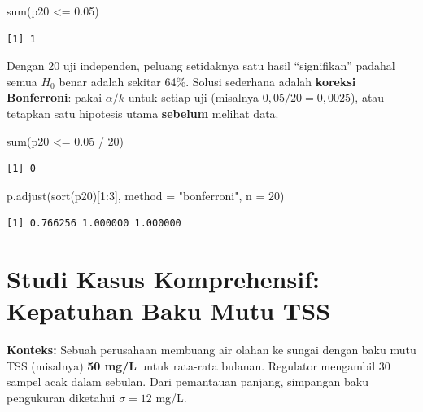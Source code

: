 \documentclass[
  indonesian,
  letterpaper,
]{book}
\newenvironment{Shaded}{\begin{snugshade}}{\end{snugshade}}
\newcommand{\AttributeTok}[1]{\textcolor[rgb]{0.40,0.45,0.13}{#1}}
\newcommand{\DecValTok}[1]{\textcolor[rgb]{0.68,0.00,0.00}{#1}}
\newcommand{\FloatTok}[1]{\textcolor[rgb]{0.68,0.00,0.00}{#1}}
\newcommand{\FunctionTok}[1]{\textcolor[rgb]{0.28,0.35,0.67}{#1}}
\newcommand{\NormalTok}[1]{\textcolor[rgb]{0.00,0.23,0.31}{#1}}
\newcommand{\SpecialCharTok}[1]{\textcolor[rgb]{0.37,0.37,0.37}{#1}}
\newcommand{\StringTok}[1]{\textcolor[rgb]{0.13,0.47,0.30}{#1}}
\begin{document}
\begin{Shaded}
\begin{Highlighting}[]
\FunctionTok{sum}\NormalTok{(p20 }\SpecialCharTok{\textless{}=} \FloatTok{0.05}\NormalTok{)}
\end{Highlighting}
\end{Shaded}

\begin{verbatim}
[1] 1
\end{verbatim}

Dengan 20 uji independen, peluang setidaknya satu hasil ``signifikan''
padahal semua \(H_0\) benar adalah sekitar 64\%. Solusi sederhana adalah
\textbf{koreksi Bonferroni}: pakai \(\alpha/k\) untuk setiap uji
(misalnya \(0{,}05/20 = 0{,}0025\)), atau tetapkan satu hipotesis utama
\textbf{sebelum} melihat data.

\begin{Shaded}
\begin{Highlighting}[]
\FunctionTok{sum}\NormalTok{(p20 }\SpecialCharTok{\textless{}=} \FloatTok{0.05} \SpecialCharTok{/} \DecValTok{20}\NormalTok{)}
\end{Highlighting}
\end{Shaded}

\begin{verbatim}
[1] 0
\end{verbatim}

\begin{Shaded}
\begin{Highlighting}[]
\FunctionTok{p.adjust}\NormalTok{(}\FunctionTok{sort}\NormalTok{(p20)[}\DecValTok{1}\SpecialCharTok{:}\DecValTok{3}\NormalTok{], }\AttributeTok{method =} \StringTok{"bonferroni"}\NormalTok{, }\AttributeTok{n =} \DecValTok{20}\NormalTok{)}
\end{Highlighting}
\end{Shaded}

\begin{verbatim}
[1] 0.766256 1.000000 1.000000
\end{verbatim}


\chapter{Studi Kasus Komprehensif: Kepatuhan Baku Mutu
TSS}\label{studi-kasus-komprehensif-kepatuhan-baku-mutu-tss}

\textbf{Konteks:} Sebuah perusahaan membuang air olahan ke sungai dengan
baku mutu TSS (misalnya) \textbf{50 mg/L} untuk rata-rata bulanan.
Regulator mengambil 30 sampel acak dalam sebulan. Dari pemantauan
panjang, simpangan baku pengukuran diketahui \(\sigma = 12\) mg/L.
\end{document}
